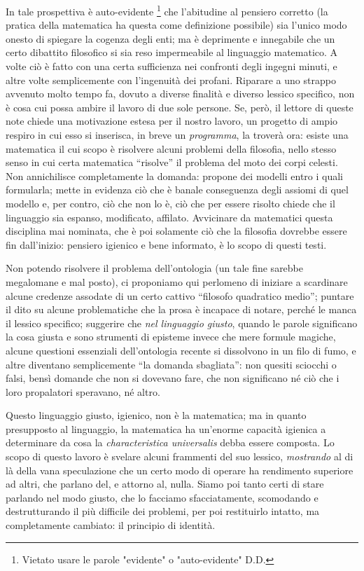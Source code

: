 \documentclass[a4paper, 11pt]{article}
\begin{document}
In tale prospettiva è auto-evidente \footnote{Vietato usare le parole "evidente" o "auto-evidente" D.D.} che l'abitudine al pensiero corretto (la pratica della matematica ha questa come definizione possibile) sia l'unico modo onesto di spiegare la cogenza degli enti; ma è deprimente e innegabile che un certo dibattito filosofico si sia reso impermeabile al linguaggio matematico. A volte ciò è fatto con una certa sufficienza nei confronti degli ingegni minuti, e altre volte semplicemente con l'ingenuità dei profani. Riparare a uno strappo avvenuto molto tempo fa, dovuto a diverse finalità e diverso lessico specifico, non è cosa cui possa ambire il lavoro di due sole persone. Se, però, il lettore di queste note chiede una motivazione estesa per il nostro lavoro, un progetto di ampio respiro in cui esso si inserisca, in breve un \emph{programma}, la troverà ora: esiste una matematica il cui scopo è risolvere alcuni problemi della filosofia, nello stesso senso in cui certa matematica ``risolve'' il problema del moto dei corpi celesti. Non annichilisce completamente la domanda: propone dei modelli entro i quali formularla; mette in evidenza ciò che è banale conseguenza degli assiomi di quel modello e, per contro, ciò che non lo è, ciò che per essere risolto chiede che il linguaggio sia espanso, modificato, affilato. Avvicinare da matematici questa disciplina mai nominata, che è poi solamente ciò che la filosofia dovrebbe essere fin dall'inizio: pensiero igienico e bene informato, è lo scopo di questi testi.

Non potendo risolvere il problema dell'ontologia (un tale fine sarebbe megalomane e mal posto), ci proponiamo qui perlomeno di iniziare a scardinare alcune credenze assodate di un certo cattivo ``filosofo quadratico medio''; puntare il dito su alcune problematiche che la prosa è incapace di notare, perché le manca il lessico specifico; suggerire che \emph{nel linguaggio giusto}, quando le parole significano la cosa giusta e sono strumenti di episteme invece che mere formule magiche, alcune questioni essenziali dell'ontologia recente si dissolvono in un filo di fumo, e altre diventano semplicemente ``la domanda sbagliata'': non quesiti sciocchi o falsi, bensì domande che non si dovevano fare, che non significano né ciò che i loro propalatori speravano, né altro.

Questo linguaggio giusto, igienico, non è la matematica; ma in quanto presupposto al linguaggio, la matematica ha un'enorme capacità igienica a determinare da cosa la \emph{characteristica universalis} debba essere composta. Lo scopo di questo lavoro è svelare alcuni frammenti del suo lessico, \emph{mostrando} al di là della vana speculazione che un certo modo di operare ha rendimento superiore ad altri, che parlano del, e attorno al, nulla. Siamo poi tanto certi di stare parlando nel modo giusto, che lo facciamo sfacciatamente, scomodando e destrutturando il più difficile dei problemi, per poi restituirlo intatto, ma completamente cambiato: il principio di identità. 
\end{document}
